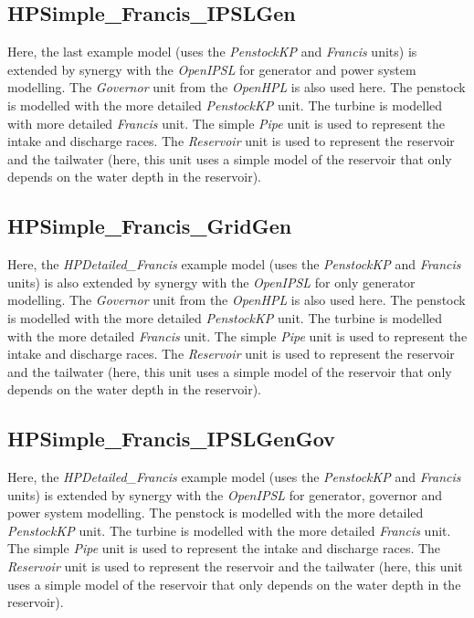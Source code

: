 \documentclass[%
]{USN-PhD}
\begin{document}
\subsection{HPSimple\_Francis\_IPSLGen}

Here, the last example model (uses the \emph{PenstockKP} and \emph{Francis} units) is extended by synergy with the \emph{OpenIPSL} for generator and power system modelling. The \emph{Governor} unit from the \emph{OpenHPL} is also used here. The penstock is modelled with the more detailed \emph{PenstockKP} unit. The turbine is modelled with more detailed \emph{Francis} unit. The simple \emph{Pipe} unit is used to represent the intake and discharge races. The \emph{Reservoir} unit is used to represent the reservoir and the tailwater (here, this unit uses a simple model of the reservoir that only depends on the water depth in the reservoir).

\subsection{HPSimple\_Francis\_GridGen}

Here, the \emph{HPDetailed\_Francis} example model (uses the \emph{PenstockKP} and \emph{Francis} units) is also extended by synergy with the \emph{OpenIPSL} for only generator modelling. The \emph{Governor} unit from the \emph{OpenHPL} is also used here. The penstock is modelled with the more detailed \emph{PenstockKP} unit. The turbine is modelled with the more detailed \emph{Francis} unit. The simple \emph{Pipe} unit is used to represent the intake and discharge races. The \emph{Reservoir} unit is used to represent the reservoir and the tailwater (here, this unit uses a simple model of the reservoir that only depends on the water depth in the reservoir).

\subsection{HPSimple\_Francis\_IPSLGenGov}

Here, the \emph{HPDetailed\_Francis} example model (uses the \emph{PenstockKP} and \emph{Francis} units) is extended by synergy with the \emph{OpenIPSL} for generator, governor and power system modelling. The penstock is modelled with the more detailed \emph{PenstockKP} unit. The turbine is modelled with the more detailed \emph{Francis} unit. The simple \emph{Pipe} unit is used to represent the intake and discharge races. The \emph{Reservoir} unit is used to represent the reservoir and the tailwater  (here, this unit uses a simple model of the reservoir that only depends on the water depth in the reservoir).
\end{document}

